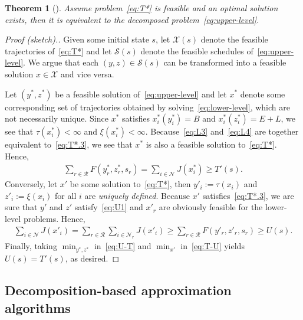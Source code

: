 \documentclass[a4paper]{report}
\theoremstyle{definition}
\theoremstyle{plain}
\newtheorem{theorem}{Theorem}[chapter]
\begin{document}
\begin{theorem}[{\cite[Theorem 1]{hultTechnicalReportApproximate}}]\label{thm:decomposition}
  Assume problem~\eqref{eq:T*} is feasible and an optimal solution exists, then it is
  equivalent to the decomposed problem~\eqref{eq:upper-level}.
\end{theorem}
\begin{proof}[Proof (sketch).]
  Given some initial state $s$, let $\mathcal{X}(s)$ denote the feasible
  trajectories of~\eqref{eq:T*} and let $\mathcal{S}(s)$ denote the feasible
  schedules of~\eqref{eq:upper-level}. We argue that each
  $(y,z) \in \mathcal{S}(s)$ can be transformed into a feasible solution
  $x \in \mathcal{X}$ and vice versa.

  Let $(y^*,z^*)$ be a feasible solution of~\eqref{eq:upper-level} and let $x^*$ denote some
  corresponding set of trajectories obtained by solving~\eqref{eq:lower-level}, which are not
  necessarily unique. Since $x^*$ satisfies $x^*_{i}(y^*_{i}) = B$ and
  $x^*_{i}(z^*_{i}) = E + L$, we see that $\tau(x^*_{i}) < \infty$ and $\xi(x^*_{i}) < \infty$.
  Because~\eqref{eq:L3} and~\eqref{eq:L4} are together equivalent to~\eqref{eq:T*.3}, we see that $x^*$ is also
  a feasible solution to~\eqref{eq:T*}. Hence,
  \begin{align}\label{eq:U-T}
    \sum_{r \in \mathcal{R}} F(y^*_r, z^*_r, s_r) = \sum_{i \in \mathcal{N}} J(x^*_i) \geq T'(s) .
  \end{align}
  Conversely, let $x'$ be some solution to~\eqref{eq:T*}, then $y'_{i} := \tau(x_{i})$ and
  $z'_{i} := \xi(x_{i})$ for all $i$ are \emph{uniquely defined}. Because $x'$
  satisfies~\eqref{eq:T*.3}, we are sure that $y'$ and $z'$ satisfy~\eqref{eq:U1} and $x'_{r}$ are
  obviously feasible for the lower-level problems. Hence,
  \begin{align}\label{eq:T-U}
    \sum_{i \in \mathcal{N}} J(x'_i) = \sum_{r \in \mathcal{R}} \sum_{i \in \mathcal{N}_r} J(x'_i)
    \geq \sum_{r \in \mathcal{R}} F(y'_r, z'_r, s_r)
    \geq U(s) .
  \end{align}
  Finally, taking $\min_{y^*,z^*}$ in~\eqref{eq:U-T} and $\min_{x'}$ in~\eqref{eq:T-U}
  yields $U(s) = T'(s)$, as desired.
\end{proof}


\subsection{Decomposition-based approximation algorithms}\label{sec:approx-algos}
\end{document}
